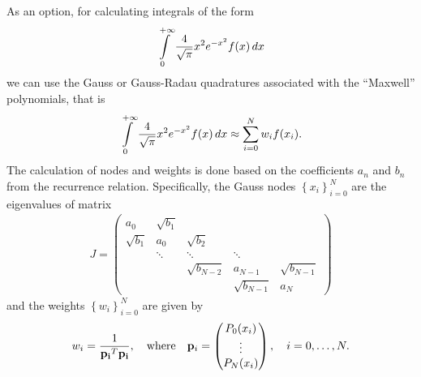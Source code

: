 \documentclass[10pt,letterpaper]{article}
\newcommand{\myint}[2]{\int\limits_{#1}^{#2}}
\newcommand{\diff}[1]{\, d#1}
\newcommand{\vect}[1]{\mathbf{#1}}
\newcommand{\of}[1]{\mleft( #1 \mright)}
\begin{document}
As an option, for calculating integrals of the form
\begin{align*}
\myint{0}{+\infty} \frac{4}{\sqrt{\pi}} x^2 e^{-x^2} f\of{x} \diff{x} 
\end{align*}
we can use the Gauss or Gauss-Radau quadratures associated with the ``Maxwell'' polynomials, that is 
\begin{align*}
\myint{0}{+\infty} \frac{4}{\sqrt{\pi}} x^2 e^{-x^2} f\of{x} \diff{x} 
\approx \sum_{i=0}^{N} w_i f\of{x_i}.
\end{align*}
The calculation of nodes and weights is done based on the coefficients $a_n$ and $b_n$ from the recurrence relation. Specifically, the Gauss nodes $\left\{x_i\right\}_{i=0}^{N}$ are the eigenvalues of matrix
\begin{align*}
J = 
\begin{pmatrix}
a_0 & \sqrt{b_1} 
\\
\sqrt{b_1} & a_0 & \sqrt{b_2}
\\
& \ddots & \ddots & \ddots 
\\
&& \sqrt{b_{N-2}} & a_{N-1} & \sqrt{b_{N-1}}
\\
&&& \sqrt{b_{N-1}} & a_{N}
\end{pmatrix}
\end{align*}
and the weights $\left\{w_i\right\}_{i=0}^{N}$ are given by
\begin{align*}
w_i = \frac{1}{\vect{p_i}^T\vect{p_i}}, 
\quad \textrm{where} \quad
\vect{p}_i =
\begin{pmatrix}
P_0 \of{x_i} \\
\vdots \\
P_N \of{x_i} \\
\end{pmatrix},
\quad i=0,\ldots,N.
\end{align*}

\end{document}
